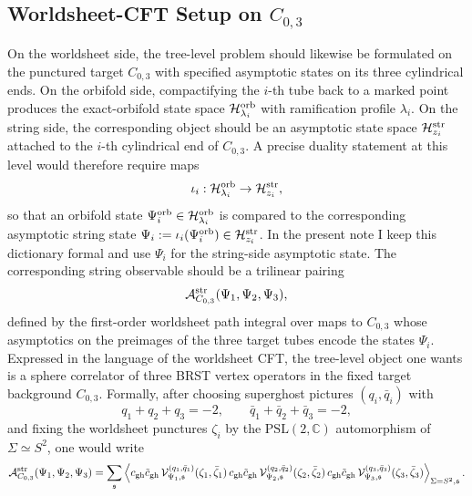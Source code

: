 \documentclass[11pt]{article}
\newcommand{\mc}[1]{\mathcal{#1}}
\newcommand{\bC}{\mathbb{C}}
\begin{document}
\subsection{Worldsheet-CFT Setup on \texorpdfstring{$C_{0,3}$}{C0,3}}

On the worldsheet side, the tree-level problem should likewise be formulated on the punctured target $C_{0,3}$ with specified asymptotic states on its three cylindrical ends. On the orbifold side, compactifying the $i$-th tube back to a marked point produces the exact-orbifold state space $\mc H^{\rm orb}_{\lambda_i}$ with ramification profile $\lambda_i$. On the string side, the corresponding object should be an asymptotic state space $\mc H^{\rm str}_{z_i}$ attached to the $i$-th cylindrical end of $C_{0,3}$. A precise duality statement at this level would therefore require maps
\begin{equation}\label{eq:tube-state-dictionary}
\iota_i:\mc H^{\rm orb}_{\lambda_i}\to \mc H^{\rm str}_{z_i},
\end{equation}
so that an orbifold state $\Psi_i^{\rm orb}\in \mc H^{\rm orb}_{\lambda_i}$ is compared to the corresponding asymptotic string state $\Psi_i:=\iota_i(\Psi_i^{\rm orb})\in \mc H^{\rm str}_{z_i}$. In the present note I keep this dictionary formal and use $\Psi_i$ for the string-side asymptotic state. The corresponding string observable should be a trilinear pairing
\begin{equation}\label{eq:pair-of-pants-amplitude}
\mc A^{\rm str}_{C_{0,3}}(\Psi_1,\Psi_2,\Psi_3),
\end{equation}
defined by the first-order worldsheet path integral over maps to $C_{0,3}$ whose asymptotics on the preimages of the three target tubes encode the states $\Psi_i$.
Expressed in the language of the worldsheet CFT, the tree-level object one wants is a sphere correlator of three BRST vertex operators in the fixed target background $C_{0,3}$. Formally, after choosing superghost pictures $(q_i,\bar q_i)$ with
\begin{equation}\label{eq:picture-balance}
q_1+q_2+q_3=-2,
\qquad
\bar q_1+\bar q_2+\bar q_3=-2,
\end{equation}
and fixing the worldsheet punctures $\zeta_i$ by the $\mathrm{PSL}(2,\bC)$ automorphism of $\Sigma\simeq S^2$, one would write
\begin{equation}\label{eq:pair-of-pants-cft-correlator}
\mc A^{\rm str}_{C_{0,3}}(\Psi_1,\Psi_2,\Psi_3)
=
\sum_{\mathfrak s}
\left\langle
c_{\rm gh}\tilde c_{\rm gh}\,\mc V_{\Psi_1,\mathfrak s}^{(q_1,\bar q_1)}(\zeta_1,\bar\zeta_1)\,
c_{\rm gh}\tilde c_{\rm gh}\,\mc V_{\Psi_2,\mathfrak s}^{(q_2,\bar q_2)}(\zeta_2,\bar\zeta_2)\,
c_{\rm gh}\tilde c_{\rm gh}\,\mc V_{\Psi_3,\mathfrak s}^{(q_3,\bar q_3)}(\zeta_3,\bar\zeta_3)
\right\rangle_{\Sigma=S^2,\mathfrak s}.
\end{equation}
\end{document}
